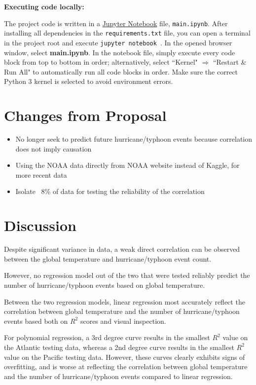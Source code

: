 \documentclass[fontsize=11pt]{article}
\begin{document}
\bigskip

\noindent \textbf{Executing code locally:}

\medskip

The project code is written in a \href{https://jupyter.readthedocs.io/en/latest/running.html}{Jupyter Notebook} file, \texttt{main.ipynb}. After installing all dependencies in the \texttt{requirements.txt} file, you can open a terminal in the project root and execute \texttt{jupyter notebook
}. In the opened browser window, select \textbf{main.ipynb}. In the notebook file, simply execute every code block from top to bottom in order; alternatively, select ``Kernel" $\Rightarrow$ ``Restart \& Run All" to automatically run all code blocks in order. Make sure the correct Python 3 kernel is selected to avoid environment errors.

\section*{Changes from Proposal}
\begin{itemize}
    \item No longer seek to predict future hurricane/typhoon events because correlation does not imply causation

    \item Using the NOAA data directly from NOAA website instead of Kaggle, for more recent data

    \item Isolate ~8\% of data for testing the reliability of the correlation
\end{itemize}

\section*{Discussion}

Despite significant variance in data, a weak direct correlation can be observed between the global temperature and hurricane/typhoon event count.

However, no regression model out of the two that were tested reliably predict the number of hurricane/typhoon events based on global temperature.

Between the two regression models, linear regression most accurately reflect the correlation between global temperature and the number of hurricane/typhoon events based both on $R^2$ scores and visual inspection.

For polynomial regression, a 3rd degree curve results in the smallest $R^2$ value on the Atlantic testing data, whereas a 2nd degree curve results in the smallest $R^2$ value on the Pacific testing data.
However, these curves clearly exhibits signs of overfitting, and is worse at reflecting the correlation between global temperature and the number of hurricane/typhoon events compared to linear regression.
\end{document}
